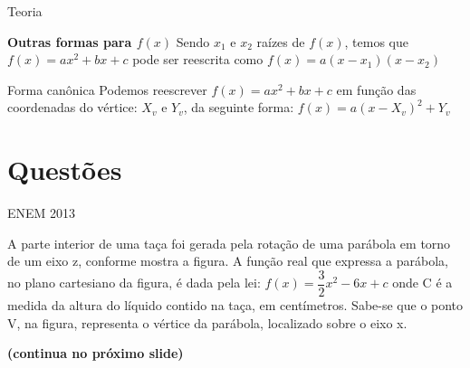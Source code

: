 \documentclass[11pt]{beamer}
\begin{document}
\begin{frame}{Teoria}

    \begin{block}{\textbf{Outras formas para $f(x)$}}
        Sendo $x_{1}$ e $x_{2}$ raízes de $f(x)$, temos que $f(x)=ax^{2}+bx+c$ pode ser reescrita como $f(x)=a(x-x_{1})(x-x_ {2})$
    \end{block}

    \pause 
    
    \begin{block}{Forma canônica}
        Podemos reescrever $f(x)=ax^{2}+bx+c$ em função das coordenadas do vértice: $X_{v}$ e $Y_{v}$, da seguinte forma: $f(x)=a(x-X_{v})^{2}+Y_{v}$
    \end{block}
    
\end{frame}



\section{Questões}

\begin{frame}{ENEM 2013}
    
    A parte interior de uma taça foi gerada pela rotação de uma parábola em torno de um eixo z, conforme mostra a figura. A função real que expressa a parábola, no plano cartesiano da figura, é dada pela lei: $f(x)=\dfrac{3}{2}x^{2}-6x+c$ onde C é a medida da altura do líquido contido na taça, em centímetros. Sabe-se que o ponto V, na figura, representa o vértice da parábola, localizado sobre o eixo x. 

    \vfill
    \textbf{(continua no próximo slide)}
    
\end{frame}
\end{document}
